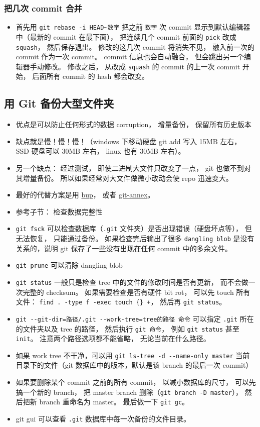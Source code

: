 \subsubsection{把几次 commit 合并}
\begin{itemize}
\item 首先用 \verb`git rebase -i HEAD~数字` 把之前 \verb`数字` 次 commit 显示到默认编辑器中（最新的 commit 在最下面）， 把连续几个 commit 前面的 \verb`pick` 改成 \verb`squash`， 然后保存退出。 修改的这几次 commit 将消失不见， 融入前一次的 commit 作为一次 commit。 commit 信息也会自动融合， 但会跳出另一个编辑器手动修改。 修改之后， 从改成 \verb`squash` 的 commit 的上一次 commit 开始， 后面所有 commit 的 hash 都会改变。
\end{itemize}


\subsection{用 Git 备份大型文件夹}
\begin{itemize}
\item 优点是可以防止任何形式的数据 corruption， 增量备份， 保留所有历史版本
\item 缺点就是慢！慢！慢！（windows 下移动硬盘 git add 写入 15MB 左右， SSD 硬盘可以 30MB 左右， linux 也有 30MB 左右）。
\item 另一个缺点： 经过测试， 即使二进制大文件只改变了一点， git 也做不到对其增量备份。 所以如果经常对大文件做微小改动会使 repo 迅速变大。
\item 最好的代替方案是用 \href{https://bup.github.io/}{bup}， 或者 \href{https://git-annex.branchable.com/}{git-annex}。
\item 参考子节： 检查数据完整性
\item \verb`git fsck` 可以检查数据库（\verb`.git` 文件夹）是否出现错误（硬盘坏点等）， 但无法恢复， 只能通过备份。 如果检查完后输出了很多 \verb`dangling blob` 是没有关系的，说明 git 保存了一些没有出现在任何 commit 中的多余文件。
\item \verb`git prune` 可以清除 dangling blob
\item \verb`git status` 一般只是检查 tree 中的文件的修改时间是否有更新， 而不会做一次完整的 checksum。 如果需要检查是否有硬件 bit rot， 可以先 touch 所有文件： \verb`find . -type f -exec touch {} +`， 然后再 \verb`git status`。
\item \verb`git --git-dir=路径/.git --work-tree=tree的路径 命令` 可以指定 \verb`.git` 所在的文件夹以及 tree 的路径， 然后执行 \verb`git 命令`， 例如 \verb`git status` 甚至 \verb`init`。 注意两个路径选项都不能省略， 无论当前在什么路径。
\item 如果 work tree 不干净，可以用 \verb`git ls-tree -d --name-only master` 当前目录下的文件（git 数据库中的版本，默认是该 branch 的最后一次 commit）
\item 如果要删除某个 commit 之前的所有 commit， 以减小数据库的尺寸， 可以先搞一个新的 branch， 把 master branch 删除（\verb`git branch -D master`）， 然后把新 branch 重命名为 master。 最后做一下 \verb`git gc`。
\item git gui 可以查看 \verb`.git` 数据库中每一次备份的文件目录。
\end{itemize}

